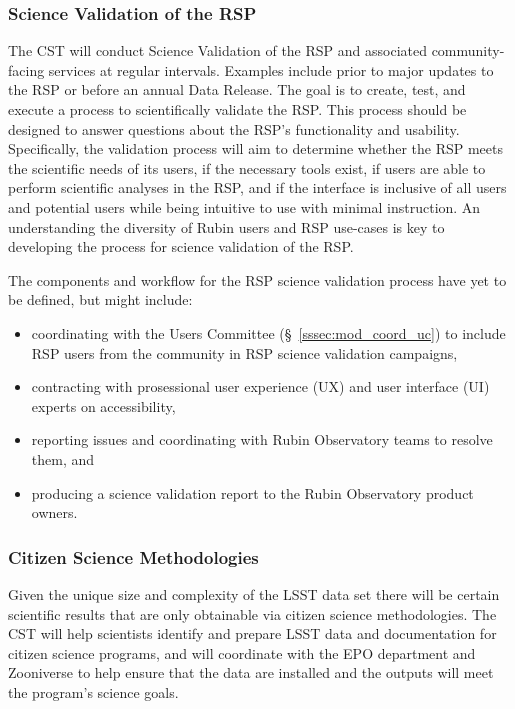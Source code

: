 \documentclass[DM,authoryear,toc]{lsstdoc}
\begin{document}
\subsubsection{Science Validation of the RSP}\label{sssec:mod_dev_sv}

The CST will conduct Science Validation of the RSP and associated community-facing services at regular intervals.
Examples include prior to major updates to the RSP or before an annual Data Release.
The goal is to create, test, and execute a process to scientifically validate the RSP.
This process should be designed to answer questions about the RSP's functionality and usability.
Specifically, the validation process will aim to determine whether the RSP meets the scientific needs of its users, if the necessary tools exist, if users are able to perform scientific analyses in the RSP, and if the interface is inclusive of all users and potential users while being intuitive to use with minimal instruction.
An understanding the diversity of Rubin users and RSP use-cases is key to developing the process for science validation of the RSP.

The components and workflow for the RSP science validation process have yet to be defined, but might include:
\begin{itemize}
\item coordinating with the Users Committee (\S~\ref{sssec:mod_coord_uc}) to include RSP users from the community in RSP science validation campaigns,
\item contracting with prosessional user experience (UX) and user interface (UI) experts on accessibility,
\item reporting issues and coordinating with Rubin Observatory teams to resolve them, and
\item producing a science validation report to the Rubin Observatory product owners.
\end{itemize}


\subsubsection{Citizen Science Methodologies}\label{sssec:mod_dev_citizen}

Given the unique size and complexity of the LSST data set there will be certain scientific results that are only obtainable via citizen science methodologies.
The CST will help scientists identify and prepare LSST data and documentation for citizen science programs, and will coordinate with the EPO department and Zooniverse to help ensure that the data are installed and the outputs will meet the program's science goals.
\end{document}
